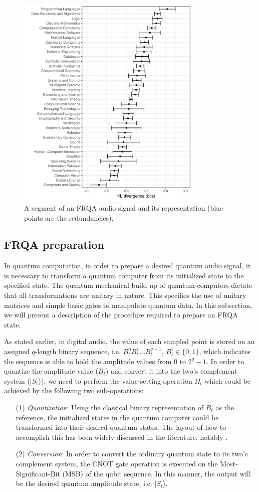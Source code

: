 \documentclass[10pt,journal,compsoc]{IEEEtran}
\begin{document}
\begin{figure}[!t]
\centering
\includegraphics[width=3.5in]{fig1}
\caption{A segment of an FRQA audio signal and its representation (blue points are the redundancies).}
\label{fig1}
\end{figure}

\subsection{FRQA preparation}\label{sec2-2}
In quantum computation, in order to prepare a desired quantum audio signal, it is necessary to transform a quantum computer from its initialized state to the specified state. The quantum mechanical build up of quantum computers dictate that all transformations are unitary in nature. This specifies the use of unitary matrices and simple basic gates to manipulate quantum data. In this subsection, we will present a description of the procedure required to prepare an FRQA state.

As stated earlier, in digital audio, the value of each sampled point is stored on an assigned $q$-length binary sequence, i.e. $B_t^0B_t^1\ldots B_t^{q-1}$, $B_t^i\in\{0, 1\}$, which indicates the sequence is able to hold the amplitude values from 0 to $2^q-1$. In order to quantize the amplitude value ($B_t$) and convert it into the two's complement system ($\vert S_t\rangle$), we need to perform the value-setting operation $\Omega_{t}$ which could be achieved by the following two sub-operations:

\begin{itemize}
  \item[(1)] \emph{Quantization}: Using the classical binary representation of $B_t$ as the reference, the initialized states in the quantum computer could be transformed into their desired quantum states. The layout of how to accomplish this has been widely discussed in the literature, notably \cite{11,12}.
  \item[(2)] \emph{Conversion}: In order to convert the ordinary quantum state to its two's complement system, the CNOT gate operation is executed on the Most-Significant-Bit (MSB) of the qubit sequence. In this manner, the output will be the desired quantum amplitude state, i.e. $\vert S_t\rangle$.
\end{itemize}
\end{document}
